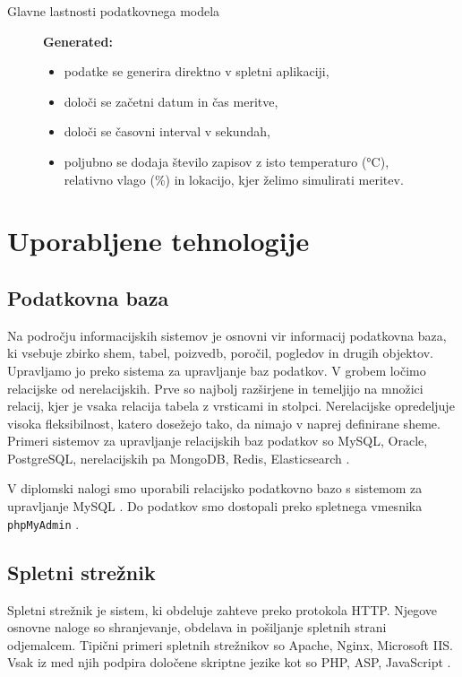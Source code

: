 \documentclass[a4paper, 12pt]{book}
\begin{document}
\begin{description}
\item[Glavne lastnosti podatkovnega modela]\textbf{Generated:}
\begin{itemize}
\item podatke se generira direktno v spletni aplikaciji,
\item določi se začetni datum in čas meritve,
\item določi se časovni interval v sekundah,
\item poljubno se dodaja število zapisov z isto temperaturo (°C), \\ relativno vlago (\%) in lokacijo, kjer želimo simulirati meritev.
\end{itemize}
\end{description}

\chapter{Uporabljene tehnologije}
\label{uporabljene-tehnologije}



\section{Podatkovna baza}

Na področju informacijskih sistemov je osnovni vir informacij podatkovna baza, ki vsebuje zbirko shem, tabel, poizvedb, poročil, pogledov in drugih objektov. Upravljamo jo preko sistema za upravljanje baz podatkov. V grobem ločimo relacijske od nerelacijskih. Prve so najbolj razširjene in temeljijo na množici relacij, kjer je vsaka relacija tabela z vrsticami in stolpci. Nerelacijske opredeljuje visoka fleksibilnost, katero dosežejo tako, da nimajo v naprej definirane sheme.
Primeri sistemov za upravljanje relacijskih baz podatkov so MySQL, Oracle, PostgreSQL, nerelacijskih pa MongoDB, Redis, Elasticsearch \cite{podatkovne-baze}.

V diplomski nalogi smo uporabili relacijsko podatkovno bazo s sistemom za upravljanje MySQL \cite{mysql-baza}. Do podatkov smo dostopali preko spletnega vmesnika \verb=phpMyAdmin= \cite{phpmyadmin-framework}.

\section{Spletni strežnik}

Spletni strežnik je sistem, ki obdeluje zahteve preko protokola HTTP.
Njegove osnovne naloge so shranjevanje, obdelava in pošiljanje spletnih strani odjemalcem. Tipični primeri spletnih strežnikov so Apache, Nginx, Microsoft IIS. Vsak iz med njih podpira določene skriptne jezike kot so PHP, ASP, JavaScript \cite{spletni-strezniki}.
\end{document}
